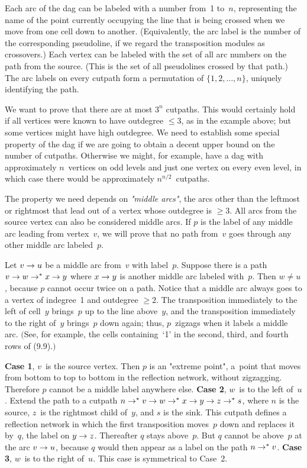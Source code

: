 Each arc of the dag can be labeled with a number from~1 to~$n$,
representing the name of the point currently occupying the line that
is being crossed when we move from one cell down to another.
(Equivalently, the arc label is the number of the corresponding
pseudoline, if we regard the transposition modules as crossovers.)
Each vertex can be labeled with the set of all arc numbers on the path
from the source. (This is the set of all pseudolines crossed by that
path.) The arc labels on every cutpath form a permutation of
$\{1,2,\ldots,n\}$, uniquely identifying the path.

We want to prove that there are at most $3^n$ cutpaths. This would
certainly hold if all vertices were known to have outdegree $\leq 3$,
as in the example above; but some vertices might have high outdegree.
We need to establish some special property of the dag if we are going
to obtain a decent upper bound on the number of cutpaths. Otherwise
we might, for example, have a dag with approximately $n$~vertices on
odd levels and just one vertex on every even level, in which case
there would be approximately $n^{n/2}$~cutpaths.

The property we need depends on {\it"middle arcs"}, the arcs other than
the leftmost or rightmost that lead out of a vertex whose outdegree is
$\geq 3$. All arcs from the source vertex  can also be considered
middle arcs. If $p$ is the label of any middle arc leading from
vertex~$v$, we will prove that no path from~$v$ goes through any other
middle arc labeled~$p$.

\goodbreak
Let $v\rightarrow u$ be a middle arc from~$v$ with label~$p$. Suppose there is
a path $v\rightarrow w\rightarrow^{\ast}x\rightarrow y$ where $x\rightarrow y$ is another middle arc
labeled with~$p$. Then $w\neq u$, because $p$ cannot occur twice on a
path. Notice that a middle arc always goes to a vertex of indegree~1 and
outdegree $\geq 2$. The transposition immediately to the left of
cell~$y$ brings~$p$ up to the line above~$y$, and the transposition
immediately to the right of~$y$ brings~$p$ down again; thus,
$p$~zigzags when it labels a middle arc. $\bigl($See, for example, the cells
containing~`1' in the second, third, and fourth rows of (9.9).$\bigr)$

{\bf Case 1}, $v$~is the source vertex. Then $p$ is an "extreme point",
a~point that moves from bottom to top to bottom in the reflection
network, without zigzagging. Therefore $p$ cannot be a middle label
anywhere else. {\bf Case 2}, $w$~is to the left of~$u$. Extend the
path to a cutpath $n\rightarrow^{\ast} v\rightarrow w\rightarrow^{\ast}x\rightarrow y\rightarrow
z\rightarrow^{\ast}s$, where $n$ is the source, $z$~is the rightmost child
of~$y$, and $s$ is the sink. This cutpath defines a reflection
network in which the first transposition moves~$p$ down and replaces
it by~$q$, the label on $y\rightarrow z$. Thereafter $q$ stays above~$p$. But
$q$ cannot be above~$p$  at the arc $v\rightarrow u$, because $q$ would then appear
as a label on the path $n\rightarrow^{\ast}v$. {\bf Case 3}, $w$~is to the
right of~$u$. This case is symmetrical to Case~2.

